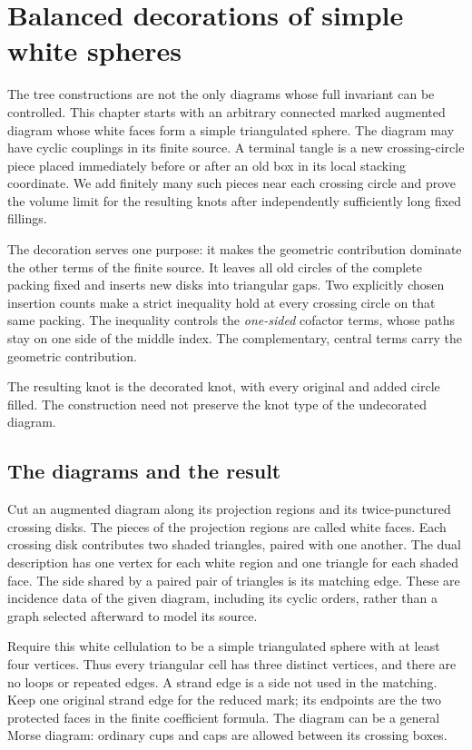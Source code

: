 \chapter{Balanced decorations of simple white spheres}
\label{ch:balanced-terminal-fans}

The tree constructions are not the only diagrams whose full invariant
can be controlled. This chapter starts with an arbitrary connected
marked augmented diagram whose white faces form a simple triangulated
sphere. The diagram may have cyclic couplings in its finite source.
A terminal tangle is a new crossing-circle piece placed immediately
before or after an old box in its local stacking coordinate. We add
finitely many such pieces near each crossing circle and
prove the volume limit for the resulting knots after independently
sufficiently long fixed fillings.

The decoration serves one purpose: it makes the geometric contribution
dominate the other terms of the finite source. It leaves all old circles
of the complete packing fixed and inserts new disks into triangular
gaps. Two explicitly chosen insertion counts make a strict inequality
hold at every crossing circle on that same packing. The inequality
controls the \emph{one-sided} cofactor terms, whose paths stay on one
side of the middle index. The complementary, central terms carry the
geometric contribution.

The resulting knot is the decorated knot, with every original and
added circle filled. The construction need not preserve the knot type
of the undecorated diagram.

\section{The diagrams and the result}

Cut an augmented diagram along its projection regions and its
twice-punctured crossing disks. The pieces of the projection regions
are called white faces. Each crossing disk contributes two shaded
triangles, paired with one another. The dual description has one
vertex for each white region and one triangle for each shaded face.
The side shared by a paired pair of triangles is its matching edge.
These are incidence data of the given diagram, including its cyclic
orders, rather than a graph selected afterward to model its source.

Require this white cellulation to be a simple triangulated sphere with
at least four vertices. Thus every triangular cell has three distinct
vertices, and there are no loops or repeated edges. A strand edge is a side not used in the matching. Keep one original
strand edge for the reduced mark; its endpoints are the two protected
faces in the finite coefficient formula. The diagram can be a general Morse diagram:
ordinary cups and caps are allowed between its crossing boxes.

